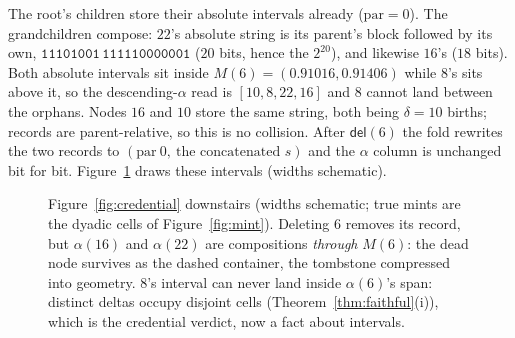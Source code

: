 \documentclass[11pt]{article}
\newcommand{\del}{\mathsf{del}}
\newcommand{\code}[1]{\texttt{#1}}
\begin{document}
\noindent The root's children store their absolute intervals already
($\mathrm{par} = 0$). The grandchildren compose: $22$'s absolute
string is its parent's block followed by its own,
$\code{11101001}\,\code{111110000001}$ ($20$ bits, hence the
$2^{20}$), and likewise $16$'s ($18$ bits). Both absolute intervals
sit inside $M(6) = (0.91016, 0.91406)$ while $8$'s sits above it, so
the descending-$\alpha$ read is $[10, 8, 22, 16]$ and $8$ cannot
land between the orphans. Nodes $16$ and $10$ store the same
string, both being $\delta = 10$ births; records are
parent-relative, so this is no collision. After $\del(6)$ the fold
rewrites the two records to $(\mathrm{par}\ 0,\ \text{the
concatenated } s)$ and the $\alpha$ column is unchanged bit for bit.
Figure~\ref{fig:nest} draws these intervals (widths schematic).

\begin{figure}[h]
\centering
{}
\caption{Figure~\ref{fig:credential} downstairs (widths schematic;
true mints are the dyadic cells of Figure~\ref{fig:mint}). Deleting
$6$ removes its record, but $\alpha(16)$ and $\alpha(22)$ are
compositions \emph{through} $M(6)$: the dead node survives as the
dashed container, the tombstone compressed into geometry. $8$'s
interval can never land inside $\alpha(6)$'s span: distinct deltas
occupy disjoint cells (Theorem~\ref{thm:faithful}(i)), which is the
credential verdict, now a fact about intervals.}
\label{fig:nest}
\end{figure}
\end{document}

